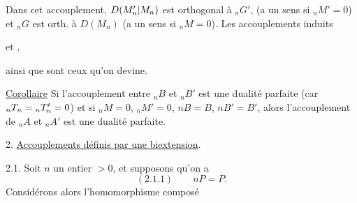 \uline{} Dans cet accouplement, $D(M'_n|M_n)$ est orthogonal à ${}_nG'$,  (a un sens si ${}_nM'=0$) et  ${}_nG$ est orth. à $D(M_n)$ (a un sens si ${}_nM=0$). Les accouplements induits


et
,

ainsi que
sont ceux qu'on devine.

\uline{Corollaire} Si l'accouplement entre ${}_nB$ et ${}_nB'$ est une dualité parfaite (car ${}_nT_n={}_nT'_n=0$)  et si ${}_nM=0$, ${}_nM'=0$, $nB=B$, $nB'=B'$, alors l'accouplement de ${}_nA$ et ${}_nA'$ est une dualité parfaite.


2. \uline{Accouplements définis par une biextension}.

2.1. Soit $n$ un entier $>0$, et supposons qu'on a
\[
(2.1.1)\qquad nP=P.
\]
Considérons alors l'homomorphisme composé

